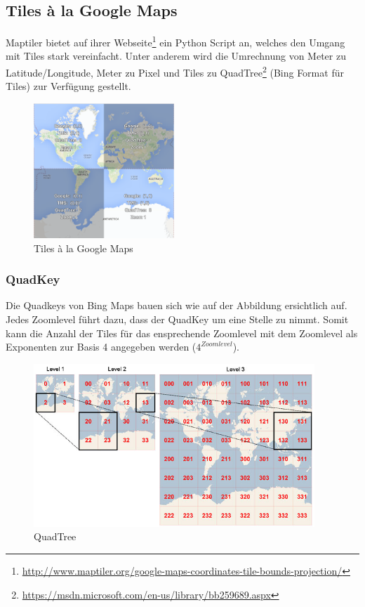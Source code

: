 \subsection{Tiles à la Google Maps}
\label{subsec:tiles}
Maptiler bietet auf ihrer Webseite\footnote{\url{http://www.maptiler.org/google-maps-coordinates-tile-bounds-projection/}} ein Python Script an, welches den Umgang mit Tiles stark vereinfacht. Unter anderem wird die Umrechnung von Meter zu Latitude/Longitude, Meter zu Pixel und Tiles zu QuadTree\footnote{\url{https://msdn.microsoft.com/en-us/library/bb259689.aspx}} (Bing Format für Tiles) zur Verfügung gestellt.

\begin{figure}[H]
\centering
\includegraphics[width=150pt]{images/tiles_a_la_google.png}
\caption[Tiles à la Google Maps]{Tiles à la Google Maps}
\end{figure}

\subsubsection{QuadKey}
Die Quadkeys von Bing Maps bauen sich wie auf der Abbildung ersichtlich auf. Jedes Zoomlevel führt dazu, dass der QuadKey um eine Stelle zu nimmt. Somit kann die Anzahl der Tiles für das ensprechende Zoomlevel mit dem Zoomlevel als Exponenten zur Basis 4 angegeben werden ($4^{Zoomlevel}$).  
\begin{figure}[H]
\centering
\includegraphics[width=300pt]{images/quadkey.png}
\caption[QuadTree]{QuadTree}
\end{figure}

